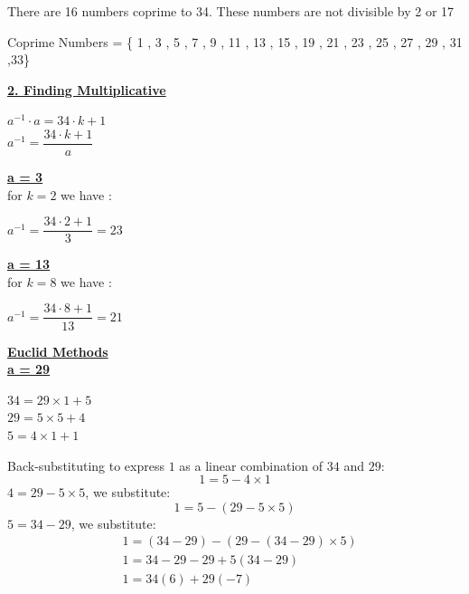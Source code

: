 \vspace{0.25cm}

There are 16 numbers coprime to 34. These numbers are not divisible by 2 or 17

\vspace{0.25cm}
\begin{center}
Coprime Numbers = \{ 1 , 3 , 5 , 7 , 9 , 11 , 13 , 15 , 19 , 21 , 23 , 25 , 27 , 29 , 31 ,33\} 
\end{center}
\vspace{1cm}
\textbf{\underline{2. Finding Multiplicative}}\\[0.15cm]
\begin{center}
    \(a^{-1}\cdot a = 34\cdot k +1\)\\[0.4cm]
    \(\boxed{a^{-1} = \dfrac{34\cdot k +1}{a}}\)
\end{center}

\newpage
\textbf{\underline{a = 3}}\\[0.15cm]
for \(k = 2\) we have :
\begin{center}
    \({a^{-1} = \dfrac{34\cdot 2 +1}{3} = \boxed{23}}\)
\end{center}

\vspace{0.5cm}

\textbf{\underline{a = 13}}\\[0.15cm]
for \(k = 8\) we have :
\begin{center}
    \({a^{-1} = \dfrac{34\cdot 8 +1}{13} = \boxed{21}}\)
\end{center}

\vspace{0.5cm}
\textbf{\underline{Euclid Methods}}\\[0.15cm]
\textbf{\underline{a = 29}}\\[0.15cm]

\begin{center}
    \(34 = 29 \times 1 + 5\)\\[0.1cm]
    \(29 = 5 \times 5 + 4\)\\[0.1cm]
    \(5 = 4 \times 1 + 1\)
\end{center}

Back-substituting to express \(1\) as a linear combination of \(34\) and \(29\):  
\[
1 = 5 - 4 \times 1
\]
\(4 = 29 - 5 \times 5\), we substitute:  
\[
1 = 5 - (29 - 5 \times 5)
\]
\(5 = 34 - 29\), we substitute: 
\begin{align*}
&1 = (34-29) - (29 - (34-29) \times 5)\\[0.1cm]
&1 = 34 - 29 - 29 + 5(34 -29)\\[0.1cm]
&1 = 34(6) + 29(\boxed{-7})
\end{align*}

